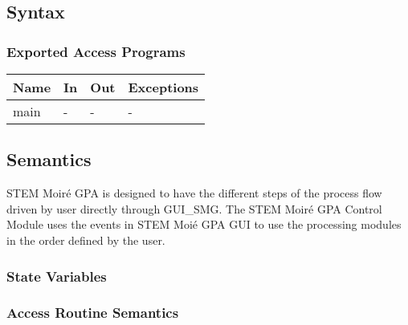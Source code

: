 \documentclass[12pt, titlepage]{article}
\newcommand{\progname}{STEM Moir{\'e} GPA}
\begin{document}
\subsection{Syntax}

\subsubsection{Exported Access Programs}

\begin{center}
\begin{tabular}{p{2cm} p{4cm} p{4cm} p{2cm}}
\hline
\textbf{Name} & \textbf{In} & \textbf{Out} & \textbf{Exceptions} \\
\hline
main & - & - & - \\
\hline
\end{tabular}
\end{center}

\subsection{Semantics}

\progname{} is designed to have the different steps of the process flow driven by user directly through GUI{\_}SMG. The STEM Moir{\'e} GPA Control Module uses the events in STEM Moi{\'e} GPA GUI to use the processing modules in the order defined by the user.

\subsubsection{State Variables}


\subsubsection{Access Routine Semantics}
\end{document}
